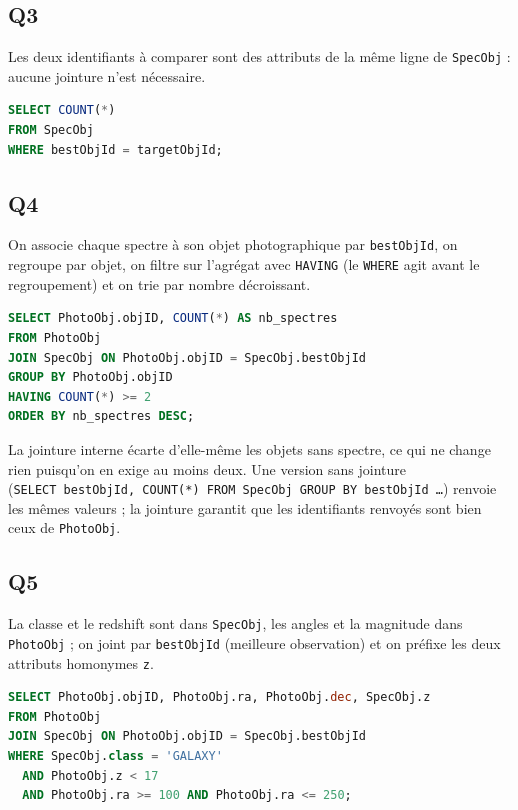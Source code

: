 \documentclass[11pt,a4paper]{article}
\begin{document}
\hypertarget{q3}{%
\subsection{Q3}\label{q3}}

Les deux identifiants à comparer sont des attributs de la même ligne de \texttt{SpecObj} : aucune jointure n'est nécessaire.

\begin{lstlisting}[language=SQL]
SELECT COUNT(*)
FROM SpecObj
WHERE bestObjId = targetObjId;
\end{lstlisting}

\hypertarget{q4}{%
\subsection{Q4}\label{q4}}

On associe chaque spectre à son objet photographique par \texttt{bestObjId}, on regroupe par objet, on filtre sur l'agrégat avec \texttt{HAVING} (le \texttt{WHERE} agit avant le regroupement) et on trie par nombre décroissant.

\begin{lstlisting}[language=SQL]
SELECT PhotoObj.objID, COUNT(*) AS nb_spectres
FROM PhotoObj
JOIN SpecObj ON PhotoObj.objID = SpecObj.bestObjId
GROUP BY PhotoObj.objID
HAVING COUNT(*) >= 2
ORDER BY nb_spectres DESC;
\end{lstlisting}

La jointure interne écarte d'elle-même les objets sans spectre, ce qui ne change rien puisqu'on en exige au moins deux. Une version sans jointure (\texttt{SELECT\ bestObjId,\allowbreak{}\ COUNT(\allowbreak{}*)\allowbreak{}\ FROM\ SpecObj\ GROUP\ BY\ bestObjId\ …}) renvoie les mêmes valeurs ; la jointure garantit que les identifiants renvoyés sont bien ceux de \texttt{PhotoObj}.

\hypertarget{q5}{%
\subsection{Q5}\label{q5}}

La classe et le redshift sont dans \texttt{SpecObj}, les angles et la magnitude dans \texttt{PhotoObj} ; on joint par \texttt{bestObjId} (meilleure observation) et on préfixe les deux attributs homonymes \texttt{z}.

\begin{lstlisting}[language=SQL]
SELECT PhotoObj.objID, PhotoObj.ra, PhotoObj.dec, SpecObj.z
FROM PhotoObj
JOIN SpecObj ON PhotoObj.objID = SpecObj.bestObjId
WHERE SpecObj.class = 'GALAXY'
  AND PhotoObj.z < 17
  AND PhotoObj.ra >= 100 AND PhotoObj.ra <= 250;
\end{lstlisting}
\end{document}
